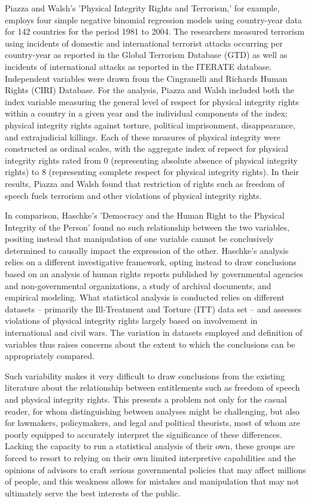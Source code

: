 \documentclass{article}
\begin{document}
Piazza and Walsh’s ’Physical Integrity Rights and Terrorism,' for example, employs four simple negative binomial regression models using country-year data for 142 countries for the period 1981 to 2004. The researchers measured terrorism using incidents of domestic and international terrorist attacks occurring per country-year as reported in the Global Terrorism Database (GTD) as well as incidents of international attacks as reported in the ITERATE database. Independent variables were drawn from the Cingranelli and Richards Human Rights (CIRI) Database. For the analysis, Piazza and Walsh included both the index variable measuring the general level of respect for physical integrity rights within a country in a given year and the individual components of the index: physical integrity rights against torture, political imprisonment, disappearance, and extrajudicial killings. Each of these measures of physical integrity were constructed as ordinal scales, with the aggregate index of repsect for physical integrity rights rated from 0 (representing absolute absence of physical integrity rights) to 8 (representing complete respect for physical integrity rights). In their results, Piazza and Walsh found that restriction of rights such as freedom of speech fuels terrorism and other violations of physical integrity rights. 

In comparison, Haschke's ’Democracy and the Human Right to the Physical Integrity of the Person' found no such relationship between the two variables, positing instead that manipulation of one variable cannot be conclusively determined to causally impact the expression of the other. Haschke's analysis relies on a different investigative framework, opting instead to draw conclusions based on an analysis of human rights reports published by governmental agencies and non-governmental organizations, a study of archival documents, and empirical modeling. What statistical analysis is conducted relies on different datasets -- primarily the Ill-Treatment and Torture (ITT) data set -- and assesses violations of physical integrity rights largely based on involvement in international and civil wars. The variation in datasets employed and definition of variables thus raises concerns about the extent to which the conclusions can be appropriately compared.

Such variability makes it very difficult to draw conclusions from the existing literature about the relationship between entitlements such as freedom of speech and physical integrity rights. This presents a problem not only for the casual reader, for whom distinguishing between analyses might be challenging, but also for lawmakers, policymakers, and legal and political theorists, most of whom are poorly equipped to accurately interpret the significance of these differences. Lacking the capacity to run a statistical analysis of their own, these groups are forced to resort to relying on their own limited interpretive capabilities and the opinions of advisors to craft serious governmental policies that may affect millions of people, and this weakness allows for mistakes and manipulation that may not ultimately serve the best interests of the public. 
\end{document}
